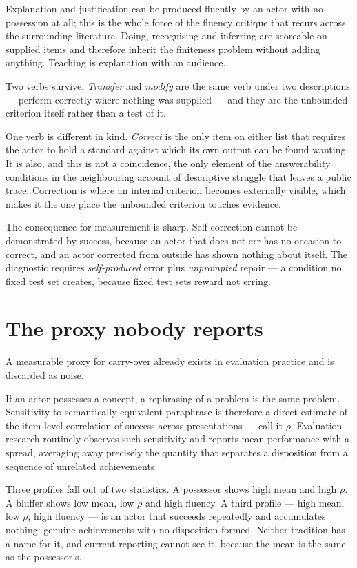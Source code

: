 \documentclass[11pt,a4paper]{article}
\begin{document}
Explanation and justification can be produced fluently by an actor with no possession at all; this is the whole force of the fluency critique that recurs across the surrounding literature. Doing, recognising and inferring are scoreable on supplied items and therefore inherit the finiteness problem without adding anything. Teaching is explanation with an audience.

Two verbs survive. \emph{Transfer} and \emph{modify} are the same verb under two descriptions --- perform correctly where nothing was supplied --- and they are the unbounded criterion itself rather than a test of it.

One verb is different in kind. \emph{Correct} is the only item on either list that requires the actor to hold a standard against which its own output can be found wanting. It is also, and this is not a coincidence, the only element of the answerability conditions in the neighbouring account of descriptive struggle that leaves a public trace. Correction is where an internal criterion becomes externally visible, which makes it the one place the unbounded criterion touches evidence.

The consequence for measurement is sharp. Self-correction cannot be demonstrated by success, because an actor that does not err has no occasion to correct, and an actor corrected from outside has shown nothing about itself. The diagnostic requires \emph{self-produced} error plus \emph{unprompted} repair --- a condition no fixed test set creates, because fixed test sets reward not erring.

\section{The proxy nobody reports}
A measurable proxy for carry-over already exists in evaluation practice and is discarded as noise.

If an actor possesses a concept, a rephrasing of a problem is the same problem. Sensitivity to semantically equivalent paraphrase is therefore a direct estimate of the item-level correlation of success across presentations --- call it $\rho$. Evaluation research routinely observes such sensitivity and reports mean performance with a spread, averaging away precisely the quantity that separates a disposition from a sequence of unrelated achievements.

Three profiles fall out of two statistics. A possessor shows high mean and high $\rho$. A bluffer shows low mean, low $\rho$ and high fluency. A third profile --- high mean, low $\rho$, high fluency --- is an actor that succeeds repeatedly and accumulates nothing: genuine achievements with no disposition formed. Neither tradition has a name for it, and current reporting cannot see it, because the mean is the same as the possessor's.
\end{document}
